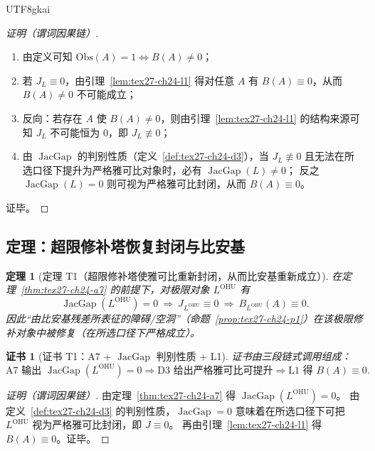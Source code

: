 \documentclass[12pt]{article}
\newtheorem{theorem}{定理}[section]
\newtheorem{Certificate}{证书}[section]
\newcommand{\JacGap}{\operatorname{JacGap}}
\begin{document}
\begin{CJK*}{UTF8}{gkai}
\begin{proof}[证明（谓词因果链）]
\begin{enumerate}
  \item 由定义可知 $\mathrm{Obs}(A)=1\Longleftrightarrow B(A)\neq 0$；
  \item 若 $J_L\equiv 0$，由引理~\ref{lem:tex27-ch24-l1} 得对任意 $A$ 有 $B(A)\equiv 0$，从而 $B(A)\neq 0$ 不可能成立；
  \item 反向：若存在 $A$ 使 $B(A)\neq 0$，则由引理~\ref{lem:tex27-ch24-l1} 的结构来源可知 $J_L$ 不可能恒为 $0$，即 $J_L\not\equiv 0$；
  \item 由 $\JacGap$ 的判别性质（定义~\ref{def:tex27-ch24-d3}），当 $J_L\not\equiv 0$ 且无法在所选口径下提升为严格雅可比对象时，必有 $\JacGap(L)\neq 0$；
  反之 $\JacGap(L)=0$ 则可视为严格雅可比封闭，从而 $B(A)\equiv 0$。
\end{enumerate}
证毕。
\end{proof}

\subsection{定理：超限修补塔恢复封闭与比安基}
\label{subsec:tex27-ch24-theorem}

\begin{theorem}[定理 T1（超限修补塔使雅可比重新封闭，从而比安基重新成立）]
\label{thm:tex27-ch24-t1}
在定理~\ref{thm:tex27-ch24-a7} 的前提下，对极限对象 $L^{\mathrm{OHU}}$ 有
\[
  \JacGap(L^{\mathrm{OHU}})=0
  \ \Longrightarrow\
  J_{L^{\mathrm{OHU}}}\equiv 0
  \ \Longrightarrow\
  B_{L^{\mathrm{OHU}}}(A)\equiv 0.
\]
因此“由比安基残差所表征的障碍/空洞”（命题~\ref{prop:tex27-ch24-p1}）在该极限修补对象中被修复（在所选口径下严格成立）。
\end{theorem}

\begin{Certificate}[证书 T1：A7 + $\JacGap$ 判别性质 + L1]
\label{cert:tex27-ch24-t1}
证书由三段链式调用组成：
\[
  \text{A7 输出 }\JacGap(L^{\mathrm{OHU}})=0
  \Rightarrow
  \text{D3 给出严格雅可比可提升}
  \Rightarrow
  \text{L1 得 }B(A)\equiv 0.
\]
\end{Certificate}

\begin{proof}[证明（谓词因果链）]
由定理~\ref{thm:tex27-ch24-a7} 得 $\JacGap(L^{\mathrm{OHU}})=0$。
由定义~\ref{def:tex27-ch24-d3} 的判别性质，$\JacGap=0$ 意味着在所选口径下可把 $L^{\mathrm{OHU}}$ 视为严格雅可比封闭，即 $J\equiv 0$。
再由引理~\ref{lem:tex27-ch24-l1} 得 $B(A)\equiv 0$。证毕。
\end{proof}


\end{CJK*}
\end{document}
